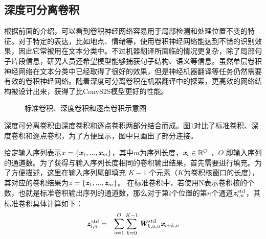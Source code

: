 
\subsection{深度可分离卷积}
\label{sec:11.3.1}

\parinterval 根据前面的介绍，可以看到卷积神经网络容易用于局部检测和处理位置不变的特征。对于特定的表达，比如地点、情绪等，使用卷积神经网络能达到不错的识别效果，因此它常被用在文本分类中。不过机器翻译所面临的情况更复杂，除了局部句子片段信息，研究人员还希望模型能够捕获句子结构、语义等信息。虽然单层卷积神经网络在文本分类中已经取得了很好的效果，但是神经机器翻译等任务仍然需要有效的卷积神经网络。随着深度可分离卷积在机器翻译中的探索，更高效的网络结构被设计出来，获得了比ConvS2S模型更好的性能。

\begin{figure}[htp]
\centering

\caption{标准卷积、深度卷积和逐点卷积示意图}
\label{fig:11-17}
\end{figure}

\parinterval 深度可分离卷积由深度卷积和逐点卷积两部分结合而成。图\ref{fig:11-17}对比了标准卷积、深度卷积和逐点卷积，为了方便显示，图中只画出了部分连接。

\parinterval 给定输入序列表示${x} = \{ \textbf{\em x}_1,...,\textbf{\em x}_m \}$，其中$m$为序列长度，$\textbf{\em x}_i \in \mathbb{R}^{O} $ ，$O$ 即输入序列的通道数。为了获得与输入序列长度相同的卷积输出结果，首先需要进行填充。为了方便描述，这里在输入序列尾部填充 $K-1$ 个元素（$K$为卷积核窗口的长度），其对应的卷积结果为${z} = \{ \textbf{\em z}_1,...,\textbf{\em z}_m \}$。
在标准卷积中，若使用N表示卷积核的个数，也就是标准卷积输出序列的通道数，那么对于第$i$个位置的第$n$个通道$ \textbf{\em z}_{i,n}^\textrm{\,std}$，其标准卷积具体计算如下：
\begin{eqnarray}
\textbf{\em z}_{i,n}^\textrm{\,std} &=& \sum_{o=1}^{O} \sum_{k=0}^{K-1} \textbf{\em W}_{k,o,n}^\textrm{\,std} \textbf{\em x}_{i+k,o}
\label{eq:11-18}
\end{eqnarray}


